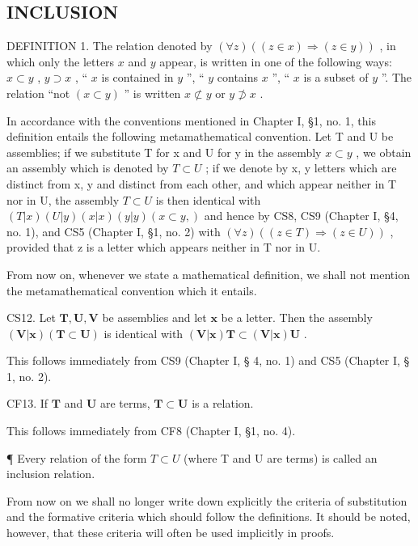 \subsection{INCLUSION}

DEFINITION 1. The relation denoted by \((\forall z)((z \in x) \Longrightarrow (z \in y))\) , in which only the letters \(x\) and \(y\) appear, is written in one of the following ways: \(x \subset y\) , \(y \supset x\) , `` \(x\) is contained in \(y\) '', `` \(y\) contains \(x\) '', `` \(x\) is a subset of \(y\) ''. The relation ``not \((x \subset y)\) '' is written \(x \not\subset y\) or \(y \not\supset x\) .

In accordance with the conventions mentioned in Chapter I, §1, no. 1, this definition entails the following metamathematical convention. Let T and U be assemblies; if we substitute T for x and U for y in the assembly \(x \subset y\) , we obtain an assembly which is denoted by \(T \subset U\) ; if we denote by x, y letters which are distinct from x, y and distinct from each other, and which appear neither in T nor in U, the assembly \(T \subset U\) is then identical with \((T|x)(U|y)(x|x)(y|y)(x \subset y,)\) and hence by CS8, CS9 (Chapter I, §4, no. 1), and CS5 (Chapter I, §1, no. 2) with \((\forall z)((z \in T) \Longrightarrow (z \in U))\) , provided that z is a letter which appears neither in T nor in U.

From now on, whenever we state a mathematical definition, we shall not mention the metamathematical convention which it entails.

CS12. Let \(\pmb{T},\pmb{U},\pmb{V}\) be assemblies and let \(\pmb{x}\) be a letter. Then the assembly \((\pmb{V}|\pmb{x})(\pmb{T}\subset \pmb{U})\) is identical with \((\pmb{V}|\pmb{x})\pmb{T}\subset (\pmb{V}|\pmb{x})\pmb{U}\) .

This follows immediately from CS9 (Chapter I, § 4, no. 1) and CS5 (Chapter I, § 1, no. 2).

CF13. If \(\pmb{T}\) and \(\pmb{U}\) are terms, \(\pmb{T} \subset \pmb{U}\) is a relation.

This follows immediately from CF8 (Chapter I, §1, no. 4).

¶ Every relation of the form \(T \subset U\) (where T and U are terms) is called an inclusion relation.

From now on we shall no longer write down explicitly the criteria of substitution and the formative criteria which should follow the definitions. It should be noted, however, that these criteria will often be used implicitly in proofs.

